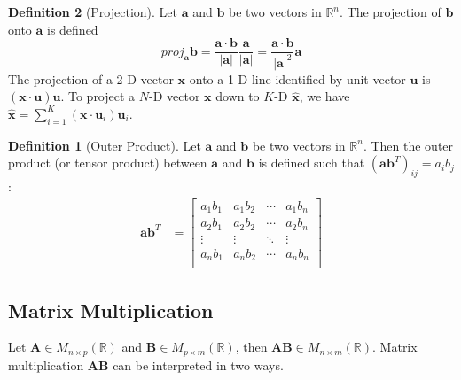 \documentclass[12pt]{article}
\theoremstyle{definition}
\newtheorem{definition}{Definition}[section]
\begin{document}
\begin{definition}[Projection]
  Let $\bm{a}$ and $\bm{b}$ be two vectors in $\mathbb{R}^n$. The projection of $\bm{b}$ onto $\bm{a}$ is defined
  \begin{equation}
proj_{\bm{a}}\bm{b}=\frac{\bm{a}\cdot\bm{b}}{|\bm{a}|}\frac{\bm{a}}{|\bm{a}|}=\frac{\bm{a}\cdot\bm{b}}{|\bm{a}|^2}\bm{a}
  \end{equation}
The projection of a 2-D vector $\bm{x}$ onto a 1-D line identified by unit vector $\bm{u}$ is $(\bm{x}\cdot\bm{u})\bm{u}$. To project a $N$-D vector $\bm{x}$ down to $K$-D $\hat{\bm{x}}$, we have $\hat{\bm{x}}=\sum_{i=1}^K(\bm{x}\cdot\bm{u}_i)\bm{u}_i$.

  
\begin{definition}[Outer Product]
Let $\bm{a}$ and $\bm{b}$ be two vectors in $\mathbb{R}^n$. Then the outer product (or tensor product) between $\bm{a}$ and $\bm{b}$ is defined such that $(\bm{a}\bm{b}^T)_{ij}=a_ib_j$:
    \begin{align}
        \bm{a}\bm{b}^T&=\begin{bmatrix}
        a_1b_1 & a_1b_2 & \cdots & a_1b_n\\
        a_2b_1 & a_2b_2 & \cdots & a_2b_n\\
        \vdots & \vdots & \ddots & \vdots\\
        a_nb_1 & a_nb_2 & \cdots & a_nb_n\\
        \end{bmatrix}
    \end{align}
\end{definition}
  
\end{definition}

\subsection{Matrix Multiplication} 
Let $\bm{A}\in M_{n\times p}(\mathbb{R})$ and $\bm{B}\in M_{p\times m}(\mathbb{R})$, then $\bm{A}\bm{B}\in M_{n\times m}(\mathbb{R})$. Matrix multiplication $\bm{AB}$ can be interpreted in two ways.
\end{document}
